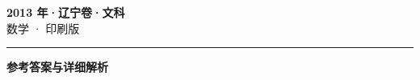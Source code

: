\documentclass[zihao=5, a4paper]{ctexart}
\begin{document}
\begin{center}
  {\Large\bfseries 2013 年·辽宁卷·文科}\\[4pt]
  {\large 数学 · 印刷版}
\end{center}
\medskip
{}

\par\bigskip\hrule\bigskip
{}
\Needspace{0.55\textheight}
\begin{center}{\large\bfseries 参考答案与详细解析}\end{center}
\smallskip

\end{document}
